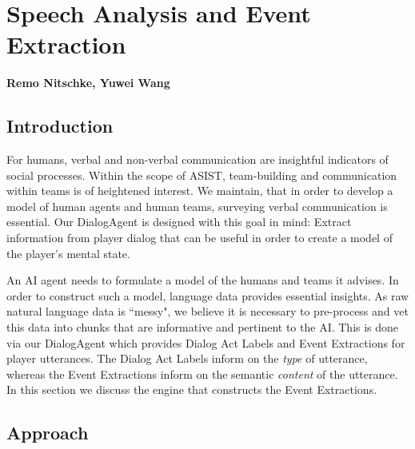 \chapter{Speech Analysis and Event Extraction}
\textbf{Remo Nitschke, Yuwei Wang}
\section{Introduction}

For humans, verbal and non-verbal communication are insightful indicators of social processes. Within the scope of ASIST, team-building and communication within teams is of heightened interest. We maintain, that in order to develop a model of human agents and human teams, surveying verbal communication is essential. Our DialogAgent is designed with this goal in mind: Extract information from player dialog that can be useful in order to create a model of the player's mental state.

An AI agent needs to formulate a model of the humans and teams it advises. In order to construct such a model, language data provides essential insights. As raw natural language data is ``messy", we believe it is necessary to pre-process and vet this data into chunks that are informative and pertinent to the AI. This is done via our DialogAgent which provides Dialog Act Labels and Event Extractions for player utterances. The Dialog Act Labels inform on the \emph{type} of utterance, whereas the Event Extractions inform on the semantic \emph{content} of the utterance. In this section we discuss the engine that constructs the Event Extractions.



\section{Approach}


